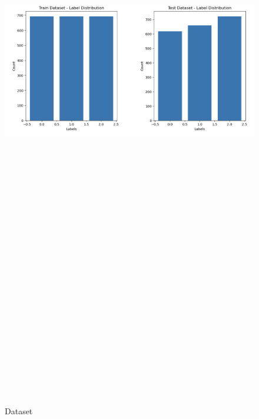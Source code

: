 \documentclass[a4paper,12pt]{article}
\begin{document}
{{{  \begin{figure}[htbp]
			\centering
			\includegraphics[width=6in, height=15in, keepaspectratio]{dataset.png}
			\label{dataset}
			\caption{Dataset }
		\end{figure}
  


}}}
\end{document}
